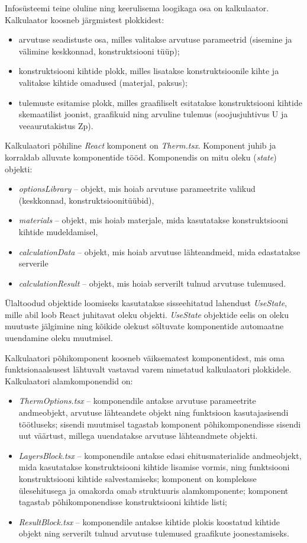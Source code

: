 Infosüsteemi teine oluline ning keerulisema loogikaga osa on kalkulaator. Kalkulaator koosneb järgmistest plokkidest:
\begin{itemize}
    \item arvutuse seadistuste osa, milles valitakse arvutuse parameetrid (sisemine ja välimine keskkonnad, konstruktsiooni tüüp);
    \item konstruktsiooni kihtide plokk, milles lisatakse konstruktsioonile kihte ja valitakse kihtide omadused (materjal, paksus);
    \item tulemuste esitamise plokk, milles graafiliselt esitatakse konstruktsiooni kihtide skemaatilist joonist, graafikuid ning arvuline tulemus 
    (soojusjuhtivus U ja veeaurutakistus Zp).
\end{itemize}

Kalkulaatori põhiline \textit{React} komponent on \textit{Therm.tsx}. Komponent juhib ja korraldab alluvate komponentide tööd. Komponendis on mitu oleku (\textit{state}) objekti:
\begin{itemize}
    \item \textit{optionsLibrary} -- objekt, mis hoiab arvutuse parameetrite valikud (keskkonnad, konstruktsioonitüübid),
    \item \textit{materials} -- objekt, mis hoiab materjale, mida kasutatakse konstruktsiooni kihtide mudeldamisel,
    \item \textit{calculationData} -- objekt, mis hoiab arvutuse lähteandmeid, mida edastatakse serverile
    \item \textit{calculationResult} -- objekt, mis hoiab serverilt tulnud arvutuse tulemused.
\end{itemize}

Ülaltoodud objektide loomiseks kasutatakse  sisseehitatud lahendust \textit{UseState}, mille abil loob React juhitavat oleku objekti. \textit{UseState}
objektide eelis on oleku muutuste jälgimine ning kõikide olekust sõltuvate komponentide automaatne uuendamine oleku muutmisel.

Kalkulaatori põhikomponent koosneb väiksematest komponentidest, mis oma funktsionaalsusest lähtuvalt vastavad varem nimetatud kalkulaatori plokkidele.
Kalkulaatori alamkomponendid on:
\begin{itemize}
    \item \textit{ThermOptions.tsx} -- komponendile antakse arvutuse parameetrite andmeobjekt, arvutuse lähteandete objekt ning funktsioon kasutajasisendi töötluseks;
    sisendi muutmisel tagastab komponent põhikomponendisse sisendi uut väärtust, millega uuendatakse arvutuse lähteandmete objekti.
    \item \textit{LayersBlock.tsx} -- komponendile antakse edasi ehitusmaterialide andmeobjekt, mida kasutatakse konstruktsiooni kihtide lisamise vormis, ning funktsiooni
    konstruktsiooni kihtide salvestamiseks; komponent on kompleksse ülesehitusega ja omakorda omab struktuuris alamkomponente; komponent tagastab põhikomponendisse konstruktsiooni
    kihtide listi;
    \item \textit{ResultBlock.tsx} -- komponendile antakse kihtide plokis koostatud kihtide objekt ning serverilt tulnud arvutuse tulemused graafikute joonestamiseks. 
\end{itemize}

